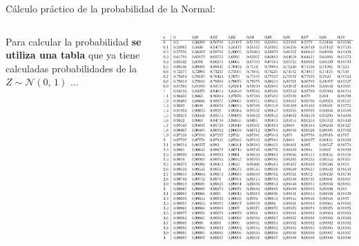 \documentclass[11pt,handout]{beamer}
\begin{document}
\begin{frame}{Cálculo práctico de la probabilidad de la Normal:}
\begin{columns}
\begin{column}{0.4\textwidth}
\begin{block}{}
Para calcular la probabilidad  \textbf{se utiliza una tabla} que ya tiene calculadas probabilidades de la  $Z \sim \mathcal{N}(0,\,1)
    $ ...
\end{block}
\end{column}
\begin{column}{0.6\textwidth}
\includegraphics[page=1,width=1\textwidth]{probabilidad/distribucion_normal}
\end{column}
\end{columns}


\end{frame}
\end{document}
